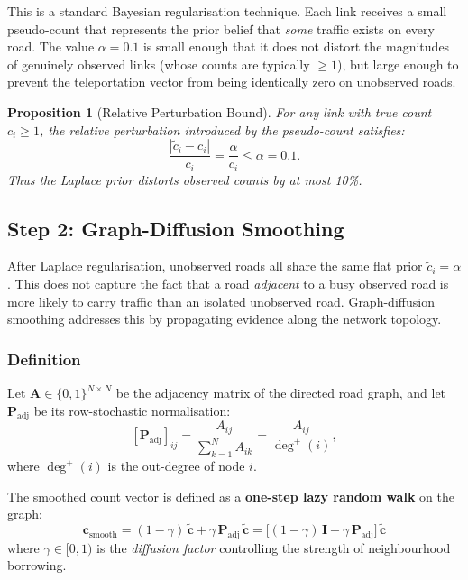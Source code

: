 \documentclass[12pt,a4paper]{article}
\theoremstyle{definition}
\theoremstyle{plain}
\newtheorem{proposition}{Proposition}[section]
\begin{document}
This is a standard Bayesian regularisation technique. Each link receives a small
pseudo-count that represents the prior belief that \emph{some} traffic exists on every
road. The value $\alpha = 0.1$ is small enough that it does not distort the magnitudes
of genuinely observed links (whose counts are typically $\geq 1$), but large enough to
prevent the teleportation vector from being identically zero on unobserved roads.

\begin{proposition}[Relative Perturbation Bound]
  For any link with true count $c_i \geq 1$, the relative perturbation
  introduced by the pseudo-count satisfies:
  \begin{equation}
    \frac{|\tilde{c}_i - c_i|}{c_i} = \frac{\alpha}{c_i} \leq \alpha = 0.1.
  \end{equation}
  Thus the Laplace prior distorts observed counts by at most 10\%.
\end{proposition}

\subsection{Step 2: Graph-Diffusion Smoothing}
\label{sec:diffusion}

After Laplace regularisation, unobserved roads all share the same flat prior
$\tilde{c}_i = \alpha$. This does not capture the fact that a road \emph{adjacent} to
a busy observed road is more likely to carry traffic than an isolated unobserved road.
Graph-diffusion smoothing addresses this by propagating evidence along the network
topology.

\subsubsection{Definition}

Let $\mathbf{A} \in \{0,1\}^{N \times N}$ be the adjacency matrix of the directed road
graph, and let $\mathbf{P}_{\text{adj}}$ be its row-stochastic normalisation:
\begin{equation}
  \left[\mathbf{P}_{\text{adj}}\right]_{ij}
  = \frac{A_{ij}}{\sum_{k=1}^N A_{ik}}
  = \frac{A_{ij}}{\deg^{+}(i)},
\end{equation}
where $\deg^{+}(i)$ is the out-degree of node $i$.

The smoothed count vector is defined as a \textbf{one-step lazy random walk} on the
graph:
\begin{equation}
  \boxed{
  \mathbf{c}_{\text{smooth}}
  = (1 - \gamma)\,\tilde{\mathbf{c}}
  + \gamma\,\mathbf{P}_{\text{adj}}\,\tilde{\mathbf{c}}
  = \bigl[(1-\gamma)\,\mathbf{I} + \gamma\,\mathbf{P}_{\text{adj}}\bigr]\,
    \tilde{\mathbf{c}}
  }
  \label{eq:smoothing}
\end{equation}
where $\gamma \in [0,1)$ is the \emph{diffusion factor} controlling the strength of
neighbourhood borrowing.
\end{document}
